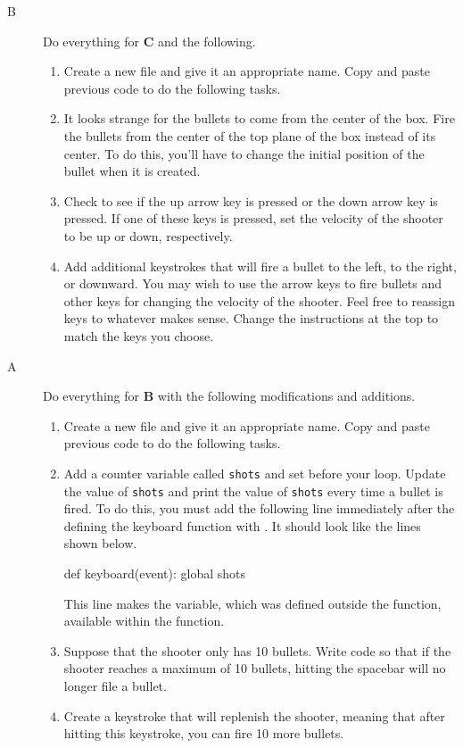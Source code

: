 \begin{description}
\begin{enumerate}
\end{enumerate}

\item[B] Do everything for {\bf C} and the following.

\begin{enumerate}
	\item Create a new file and give it an appropriate name. Copy and paste previous code to do the following tasks.
	\item It looks strange for the bullets to come from the center of the box. Fire the bullets from the center of the top plane of the box instead of its center. To do this, you'll have to change the initial position of the bullet when it is created.
	\item Check to see if the up arrow key is pressed or the down arrow key is pressed. If one of these keys is pressed, set the velocity of the shooter to be up or down, respectively.
	\item Add additional keystrokes that will fire a bullet to the left, to the right, or downward. You may wish to use the arrow keys to fire bullets and other keys for changing the velocity of the shooter. Feel free to reassign keys to whatever makes sense. Change the instructions at the top to match the keys you choose.
\end{enumerate}

\item[A] Do everything for {\bf B} with the following modifications and additions.

\begin{enumerate}
	\item Create a new file and give it an appropriate name. Copy and paste previous code to do the following tasks.
	\item Add a counter variable called \texttt{shots} and set  before your  loop. Update the value of \texttt{shots} and print the value of \texttt{shots} every time a bullet is fired. To do this, you must add the following line immediately after the defining the keyboard function with . It should look like the lines shown below.
	
\begin{myvpython}
def keyboard(event):
	global shots
\end{myvpython}
	
	This line makes the  variable, which was defined outside the function, available within the function.
	
	\item Suppose that the shooter only has 10 bullets. Write code so that if the shooter reaches a maximum of 10 bullets, hitting the spacebar will no longer file a bullet.
	\item Create a keystroke that will replenish the shooter, meaning that after hitting this keystroke, you can fire 10 more bullets.
\end{enumerate}


\end{description}


